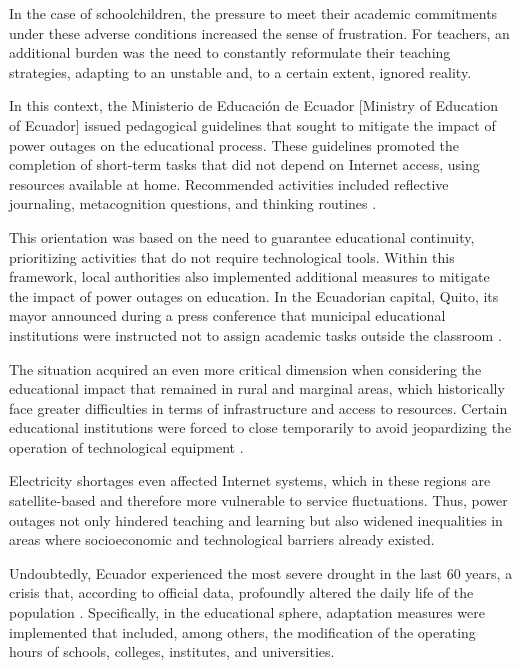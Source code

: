 \documentclass[english]{textolivre}
\begin{document}
In the case of schoolchildren, the pressure to meet their academic commitments under these adverse conditions increased the sense of frustration. For teachers, an additional burden was the need to constantly reformulate their teaching strategies, adapting to an unstable and, to a certain extent, ignored reality.

In this context, the Ministerio de Educación de Ecuador [Ministry of Education of Ecuador] issued pedagogical guidelines that sought to mitigate the impact of power outages on the educational process. These guidelines promoted the completion of short-term tasks that did not depend on Internet access, using resources available at home. Recommended activities included reflective journaling, metacognition questions, and thinking routines \cite{zevallos2024velas}.

This orientation was based on the need to guarantee educational continuity, prioritizing activities that do not require technological tools. Within this framework, local authorities also implemented additional measures to mitigate the impact of power outages on education. In the Ecuadorian capital, Quito, its mayor announced during a press conference that municipal educational institutions were instructed not to assign academic tasks outside the classroom \cite{primicias2024adiosapagones}.

The situation acquired an even more critical dimension when considering the educational impact that remained in rural and marginal areas, which historically face greater difficulties in terms of infrastructure and access to resources. Certain educational institutions were forced to close temporarily to avoid jeopardizing the operation of technological equipment \cite{cardenas2024crisis}.

Electricity shortages even affected Internet systems, which in these regions are satellite-based and therefore more vulnerable to service fluctuations. Thus, power outages not only hindered teaching and learning but also widened inequalities in areas where socioeconomic and technological barriers already existed.

Undoubtedly, Ecuador experienced the most severe drought in the last 60 years, a crisis that, according to official data, profoundly altered the daily life of the population \cite{mella2024oscuras}. Specifically, in the educational sphere, adaptation measures were implemented that included, among others, the modification of the operating hours of schools, colleges, institutes, and universities.
\end{document}
